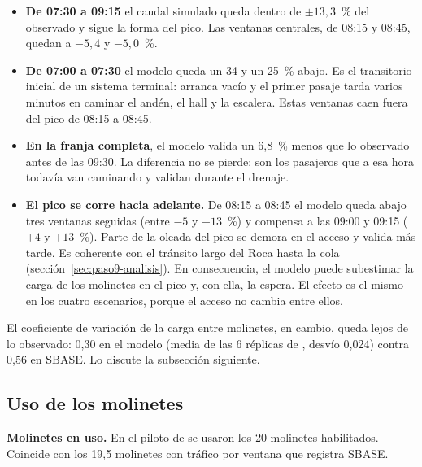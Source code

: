 \begin{itemize}
  \item \textbf{De 07:30 a 09:15} el caudal simulado queda dentro de $\pm 13{,}3$~\% del observado y sigue la
        forma del pico. Las ventanas centrales, de 08:15 y 08:45, quedan a $-5{,}4$ y $-5{,}0$~\%.
  \item \textbf{De 07:00 a 07:30} el modelo queda un 34 y un 25~\% abajo. Es el transitorio inicial de un
        sistema terminal: arranca vacío y el primer pasaje tarda varios minutos en caminar el andén, el hall
        y la escalera. Estas ventanas caen fuera del pico de 08:15 a 08:45.
  \item \textbf{En la franja completa}, el modelo valida un 6,8~\% menos que lo observado antes de las 09:30. La
        diferencia no se pierde: son los pasajeros que a esa hora todavía van caminando y validan durante el
        drenaje.
  \item \textbf{El pico se corre hacia adelante.} De 08:15 a 08:45 el modelo queda abajo tres ventanas
        seguidas (entre $-5$ y $-13$~\%) y compensa a las 09:00 y 09:15 ($+4$ y $+13$~\%). Parte de la oleada
        del pico se demora en el acceso y valida más tarde. Es coherente con el tránsito largo del Roca hasta
        la cola (sección~\ref{sec:paso9-analisis}). En consecuencia, el modelo puede subestimar la carga de los
        molinetes en el pico y, con ella, la espera. El efecto es el mismo en los cuatro escenarios, porque el
        acceso no cambia entre ellos.
\end{itemize}
El coeficiente de variación de la carga entre molinetes, en cambio, queda lejos de lo observado: 0,30 en el
modelo (media de las 6 réplicas de \EO{}, desvío 0,024) contra 0,56 en SBASE. Lo discute la subsección
siguiente.

\subsection{Uso de los molinetes}
\label{anx:uso-molinetes}

\textbf{Molinetes en uso.} En el piloto de \EO{} se usaron los 20 molinetes habilitados. Coincide con los 19,5 molinetes
con tráfico por ventana que registra SBASE.

